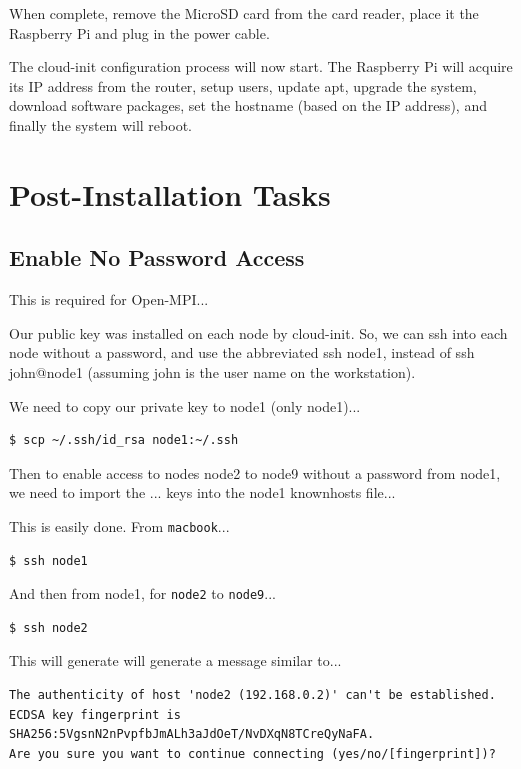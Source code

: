 \documentclass{report}
\begin{document}
When complete, remove the MicroSD card from the card reader, place it the Raspberry Pi and plug in the power cable.

The cloud-init configuration process will now start. The Raspberry Pi will acquire its IP address from the router, setup users, update apt, upgrade the system, download software packages, set the hostname (based on the IP address), and finally the system will reboot.


%
%
\clearpage\section{Post-Installation Tasks}

\subsection{Enable No Password Access}

This is required for Open-MPI...

Our public key was installed on each node by cloud-init. So, we can ssh into each node without a password, and use the abbreviated ssh node1, instead of ssh john@node1 (assuming john is the user name on the workstation).

We need to copy our private key to node1 (only node1)...

\lstset{style=termstyle}
\begin{lstlisting}
$ scp ~/.ssh/id_rsa node1:~/.ssh
\end{lstlisting}

Then to enable access to nodes node2 to node9 without a password from node1, we need to import the ... keys into the node1 knownhosts file...

This is easily done. From \verb|macbook|...

\lstset{style=termstyle}
\begin{lstlisting}[]
$ ssh node1
\end{lstlisting}

And then from node1, for \verb|node2| to \verb|node9|...

\lstset{style=termstyle}
\begin{lstlisting}[]
$ ssh node2
\end{lstlisting}

This will generate will generate a message similar to...

\lstset{style=termstyle}
\begin{lstlisting}[]
The authenticity of host 'node2 (192.168.0.2)' can't be established.
ECDSA key fingerprint is SHA256:5VgsnN2nPvpfbJmALh3aJdOeT/NvDXqN8TCreQyNaFA.
Are you sure you want to continue connecting (yes/no/[fingerprint])?
\end{lstlisting}
\end{document}
